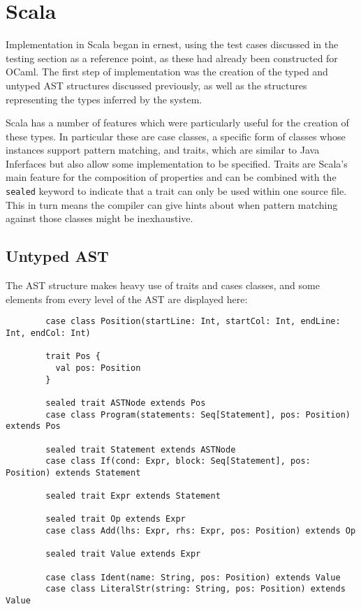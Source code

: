 \documentclass[british, twoside]{bhamthesis}
\theoremstyle{definition}
\begin{document}
  \section{Scala}
    Implementation in Scala began in ernest, using the test cases discussed in the testing section as a reference point, as these had already been constructed for OCaml. The first step of implementation was the creation of the typed and untyped AST structures discussed previously, as well as the structures representing the types inferred by the system.

    Scala has a number of features which were particularly useful for the creation of these types. In particular these are case classes, a specific form of classes whose instances support pattern matching, and traits, which are similar to Java Inferfaces but also allow some implementation to be specified. Traits are Scala's main feature for the composition of properties and can be combined with the \texttt{sealed} keyword to indicate that a trait can only be used within one source file. This in turn means the compiler can give hints about when pattern matching against those classes might be inexhaustive.

    \subsection{Untyped AST}
      The AST structure makes heavy use of traits and cases classes, and some elements from every level of the AST are displayed here:
      \begin{lstlisting}
        case class Position(startLine: Int, startCol: Int, endLine: Int, endCol: Int)

        trait Pos {
          val pos: Position
        }

        sealed trait ASTNode extends Pos
        case class Program(statements: Seq[Statement], pos: Position) extends Pos

        sealed trait Statement extends ASTNode
        case class If(cond: Expr, block: Seq[Statement], pos: Position) extends Statement

        sealed trait Expr extends Statement

        sealed trait Op extends Expr
        case class Add(lhs: Expr, rhs: Expr, pos: Position) extends Op

        sealed trait Value extends Expr

        case class Ident(name: String, pos: Position) extends Value
        case class LiteralStr(string: String, pos: Position) extends Value
      \end{lstlisting}
\end{document}
